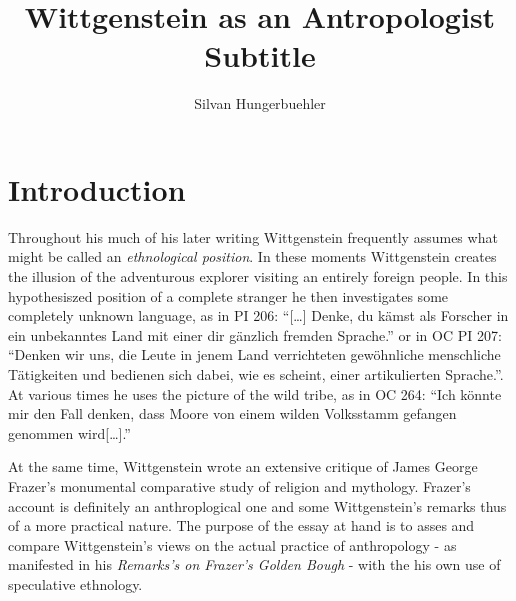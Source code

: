 \documentclass{article}
\title{Wittgenstein as an Antropologist\\
\large Subtitle}
\date{}
\author{Silvan Hungerbuehler}
\begin{document}
\maketitle
\section{Introduction}
Throughout his much of his later writing Wittgenstein frequently assumes what might be called an \textit{ethnological position}. In these moments Wittgenstein creates the illusion of the adventurous explorer visiting an entirely foreign people. In this hypothesiszed position of a complete stranger
he then investigates some completely unknown language, as in PI 206: “[…] Denke, du kämst als Forscher in ein unbekanntes Land mit einer dir gänzlich fremden Sprache.” or in OC PI 207: “Denken wir uns, die Leute in jenem Land verrichteten gewöhnliche menschliche Tätigkeiten und bedienen sich dabei, wie es scheint, einer artikulierten Sprache.”. At various times he uses the picture of the wild tribe, as in OC 264: “Ich könnte mir den Fall denken, dass Moore von einem wilden Volksstamm gefangen genommen wird[…].” 

At the same time, Wittgenstein wrote an extensive critique of James George Frazer's monumental comparative study of religion and mythology. Frazer's account is definitely an anthroplogical one and some Wittgenstein's remarks thus of a more practical nature. The purpose of the essay at hand is to asses and compare Wittgenstein's views on the actual practice of anthropology - as manifested in his \textit{Remarks's on Frazer's Golden Bough} - with the his own use of speculative ethnology. 
\end{document}
